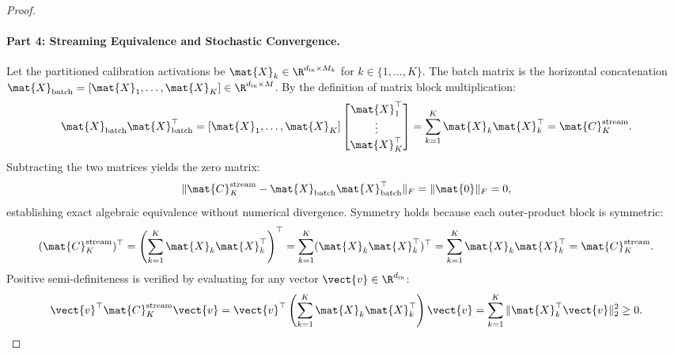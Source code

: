\begin{proof}
\paragraph{Part 4: Streaming Equivalence and Stochastic Convergence.}
Let the partitioned calibration activations be $\mat{X}_k \in \R^{d_{\text{in}} \times M_k}$ for $k \in \{1, \dots, K\}$.
The batch matrix is the horizontal concatenation $\mat{X}_{\text{batch}} = [\mat{X}_1, \dots, \mat{X}_K] \in \R^{d_{\text{in}} \times M}$.
By the definition of matrix block multiplication:
\begin{equation}
\mat{X}_{\text{batch}} \mat{X}_{\text{batch}}^\top = [\mat{X}_1, \dots, \mat{X}_K] \begin{bmatrix} \mat{X}_1^\top \\ \vdots \\ \mat{X}_K^\top \end{bmatrix} = \sum_{k=1}^K \mat{X}_k \mat{X}_k^\top = \mat{C}_K^{\text{stream}}.
\end{equation}
Subtracting the two matrices yields the zero matrix:
\begin{equation}
\|\mat{C}_K^{\text{stream}} - \mat{X}_{\text{batch}} \mat{X}_{\text{batch}}^\top\|_F = \|\mat{0}\|_F = 0,
\end{equation}
establishing exact algebraic equivalence without numerical divergence.
Symmetry holds because each outer-product block is symmetric:
\begin{equation}
(\mat{C}_K^{\text{stream}})^\top = \left( \sum_{k=1}^K \mat{X}_k \mat{X}_k^\top \right)^\top = \sum_{k=1}^K (\mat{X}_k \mat{X}_k^\top)^\top = \sum_{k=1}^K \mat{X}_k \mat{X}_k^\top = \mat{C}_K^{\text{stream}}.
\end{equation}
Positive semi-definiteness is verified by evaluating for any vector $\vect{v} \in \R^{d_{\text{in}}}$:
\begin{equation}
\vect{v}^\top \mat{C}_K^{\text{stream}} \vect{v} = \vect{v}^\top \left( \sum_{k=1}^K \mat{X}_k \mat{X}_k^\top \right) \vect{v} = \sum_{k=1}^K \|\mat{X}_k^\top \vect{v}\|_2^2 \ge 0.
\end{equation}


\end{proof}
